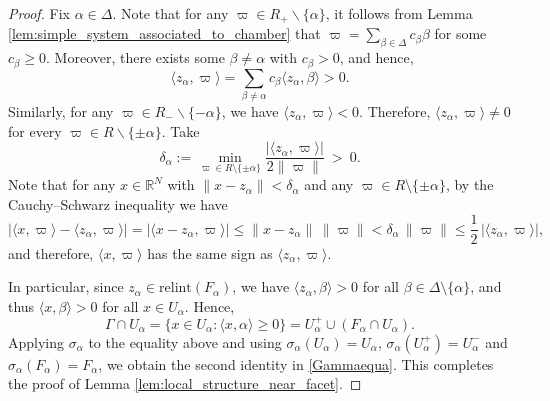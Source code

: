 \documentclass[12pt]{amsart}
\begin{document}
\begin{proof}
Fix $\alpha\in\Delta$. Note that for any $\varpi\in R_+\backslash \{\alpha\}$, it follows from Lemma \ref{lem:simple_system_associated_to_chamber} that $\varpi=\sum_{\beta\in\Delta} c_\beta\beta$ for some $c_\beta\ge 0$. Moreover, there exists some $\beta\neq\alpha$ with $c_\beta>0$, and hence,
\[
\langle z_\alpha,\varpi\rangle=\sum_{\beta\neq\alpha} c_\beta\langle z_\alpha,\beta\rangle>0.
\]
Similarly, for any $\varpi\in R_-\backslash \{-\alpha\}$, we have $\langle z_\alpha,\varpi\rangle<0$.
Therefore, $\langle z_\alpha,\varpi\rangle\neq 0$ for every $\varpi\in R\backslash \{\pm\alpha\}$. Take \[
\delta_\alpha:=\min_{\varpi\in R\setminus\{\pm\alpha\}}
\frac{|\langle z_\alpha,\varpi\rangle|}{2\|\varpi\|}\ >\ 0.
\]
Note that for any $x\in\mathbb{R}^N$ with $\|x-z_\alpha\|<\delta_\alpha$ and any $\varpi\in R\setminus\{\pm\alpha\}$, by the Cauchy--Schwarz inequality we have
\[
\big|\langle x,\varpi\rangle-\langle z_\alpha,\varpi\rangle\big|
=\big|\langle x-z_\alpha,\varpi\rangle\big|
\le \|x-z_\alpha\|\,\|\varpi\|
<\delta_\alpha\,\|\varpi\|
\le \frac12\,|\langle z_\alpha,\varpi\rangle|,
\]
and therefore, $\langle x,\varpi\rangle$ has the same sign as $\langle z_\alpha,\varpi\rangle$.

In particular, since $z_\alpha\in\mathrm{relint}(F_\alpha)$, we have $\langle z_\alpha,\beta\rangle>0$ for all
$\beta\in\Delta\setminus\{\alpha\}$, and thus $\langle x,\beta\rangle>0$ for all $x\in U_\alpha$. Hence,
\[
\Gamma\cap U_\alpha=\{x\in U_\alpha:\langle x,\alpha\rangle\ge 0\}
=U_\alpha^+\cup(F_\alpha\cap U_\alpha).
\]
Applying $\sigma_\alpha$ to the equality above and using $\sigma_\alpha(U_\alpha)=U_\alpha$, $\sigma_\alpha(U_\alpha^+)=U_\alpha^-$ and
$\sigma_\alpha(F_\alpha)=F_\alpha$, we obtain the second identity in \eqref{Gammaequa}. This completes the proof of Lemma \ref{lem:local_structure_near_facet}.
\end{proof}
\end{document}
